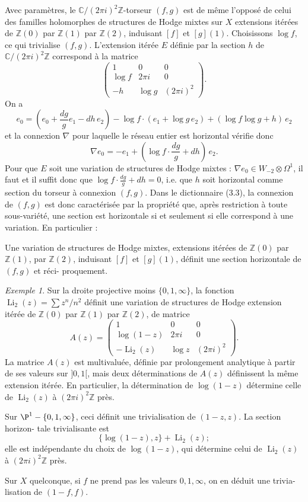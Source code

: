 \documentclass[12pt,a4paper]{article}
\theoremstyle{plain}
\theoremstyle{definition}
\theoremstyle{remark}
\newtheorem{example}[theorem]{Exemple}
\newcommand{\Z}{\mathbb{Z}}
\newcommand{\C}{\mathbb{C}}
\begin{document}
Avec paramètres, le $\C/(2\pi i)^2\Z$-torseur $(f,g)$ est de même l'opposé de celui
des familles holomorphes de structures de Hodge mixtes sur $X$ extensions itérées de $\Z(0)$
par $\Z(1)$ par $\Z(2)$, induisant $[f]$ et $[g](1)$. Choisissons $\log f$, ce qui trivialise $(f,g)$.
L'extension itérée $E$ définie par la section $h$ de $\C/(2\pi i)^2\Z$ correspond à la matrice
\[
\begin{pmatrix}
1 & 0 & 0 \\
\log f & 2\pi i & 0 \\
-h & \log g & (2\pi i)^2
\end{pmatrix}.
\]
On a
\[
e_0 = (e_0 + \frac{dg}{g} e_1 - dh \, e_2) - \log f \cdot (e_1 + \log g \, e_2) + (\log f \log g + h) \, e_2
\]
et la connexion $\nabla$ pour laquelle le réseau entier est horizontal vérifie donc
\[
\nabla e_0 = -e_1 + (\log f \cdot \frac{dg}{g} + dh) \, e_2.
\]
Pour que $E$ soit une variation de structures de Hodge mixtes : $\nabla e_0 \in W_{-2} \otimes \Omega^1$,
il faut et il suffit donc que $\log f \cdot \frac{dg}{g} + dh = 0$, i.e. que $h$ soit horizontal comme section du
torseur à connexion $(f,g)$. Dans le dictionnaire (3.3), la connexion de $(f,g)$ est donc
caractérisée par la propriété que, après restriction à toute sous-variété, une section est
horizontale si et seulement si elle correspond à une variation. En particulier :

\begin{construction}
Une variation de structures de Hodge mixtes, extensions itérées de $\Z(0)$
par $\Z(1)$, par $\Z(2)$, induisant $[f]$ et $[g](1)$, définit une section horizontale de $(f,g)$ et réci-
proquement.
\end{construction}

\begin{example}
Sur la droite projective moins $\{0, 1, \infty\}$, la fonction $\operatorname{Li}_2(z) = \sum z^n/n^2$
définit une variation de structures de Hodge extension itérée de $\Z(0)$ par $\Z(1)$ par $\Z(2)$,
de matrice
\[
A(z) = \begin{pmatrix}
1 & 0 & 0 \\
\log(1-z) & 2\pi i & 0 \\
-\operatorname{Li}_2(z) & \log z & (2\pi i)^2
\end{pmatrix}.
\]
La matrice $A(z)$ est multivaluée, définie par prolongement analytique à partir de ses
valeurs sur $]0,1[$, mais deux déterminations de $A(z)$ définissent la même extension
itérée. En particulier, la détermination de $\log(1-z)$ détermine celle de $\operatorname{Li}_2(z)$ à
$(2\pi i)^2\Z$ près.

Sur $\P^1 - \{0, 1, \infty\}$, ceci définit une trivialisation de $(1-z, z)$. La section horizon-
tale trivialisante est
\[
\{\log(1-z), z\} + \operatorname{Li}_2(z);
\]
elle est indépendante du choix de $\log(1-z)$, qui détermine celui de $\operatorname{Li}_2(z)$ à $(2\pi i)^2\Z$ près.

Sur $X$ quelconque, si $f$ ne prend pas les valeurs $0, 1, \infty$, on en déduit une trivia-
lisation de $(1-f, f)$.
\end{example}
\end{document}
